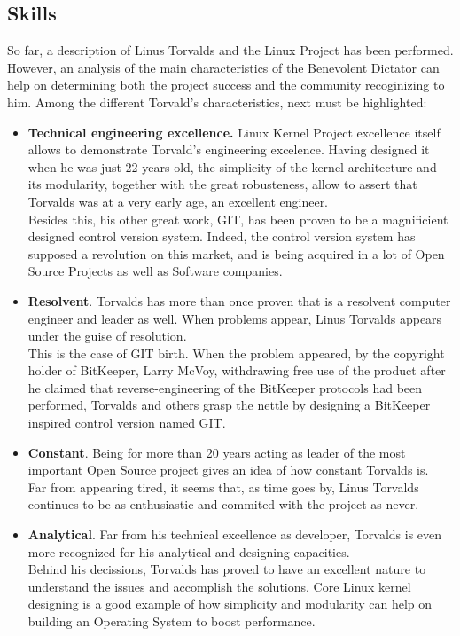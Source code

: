 \documentclass[11pt]{article}
\begin{document}
\subsection{Skills}
So far, a description of Linus Torvalds and the Linux Project has been performed. However, an analysis of the main characteristics of the Benevolent Dictator can help on determining both the project success and the community recoginizing to him. Among the different Torvald's characteristics, next must be highlighted:
\begin{itemize}
\item{\textbf{Technical engineering excellence.}}
Linux Kernel Project excellence itself allows to demonstrate Torvald's engineering excelence. Having designed it when he was just 22 years old, the simplicity of the kernel architecture and its modularity, together with the great robusteness, allow to assert that Torvalds was at a very early age, an excellent engineer.\\
Besides this, his other great work, GIT, has been proven to be a magnificient designed control version system. Indeed, the control version system has supposed a revolution on this market, and is being acquired in a lot of Open Source Projects as well as Software companies.
\item{\textbf{Resolvent}.} Torvalds has more than once proven that is a resolvent computer engineer and leader as well. When problems appear, Linus Torvalds appears under the guise of resolution.\\
This is the case of GIT birth. When the problem appeared, by the copyright holder of BitKeeper, Larry McVoy, withdrawing free use of the product after he claimed that reverse-engineering of the BitKeeper protocols had been performed, Torvalds and others grasp the nettle by designing a BitKeeper inspired control version named GIT.
\item{\textbf{Constant}.} Being for more than 20 years acting as leader of the most important Open Source project gives an idea of how constant Torvalds is.\\
Far from appearing tired, it seems that, as time goes by, Linus Torvalds continues to be as enthusiastic and commited with the project as never.
\item{\textbf{Analytical}.} Far from his technical excellence as developer, Torvalds is even more recognized for his analytical and designing capacities.\\
Behind his decissions, Torvalds has proved to have an excellent nature to understand the issues and accomplish the solutions. Core Linux kernel designing is a good example of how simplicity and modularity can help on building an Operating System to boost performance.\\

\end{itemize}
\end{document}
